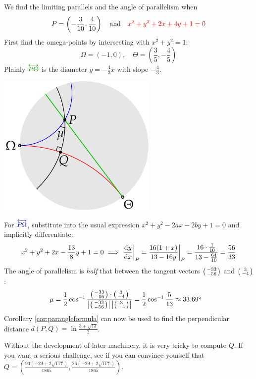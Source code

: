 \begin{examples}{}{}
\begin{enumerate}
\begin{minipage}[t]{0.68\linewidth}\vspace{0pt}
  \item We find the limiting parallels and the angle of parallelism when
	\[P=\left(-\frac 3{10},\frac 4{10}\right)\quad\text{and}\quad \textcolor{red}{x^2+y^2+2x+4y+1=0}\]
	First find the omega-points by intersecting with $x^2+y^2=1$:
	\[\Omega=(-1,0),\quad \Theta=\left(\frac 35,-\frac 45\right)\]
	Plainly $\textcolor{Green}{\overleftrightarrow{P\Theta}}$ is the diameter $y=-\frac 43x$ with slope $-\frac 43$.
\end{minipage}\begin{minipage}[t]{0.32\linewidth}\vspace{0pt}
	\flushright\includegraphics{basic-parallels3}
\end{minipage}\smallbreak
	For $\textcolor{blue}{\overleftrightarrow{P\Omega}}$, substitute into the usual expression $x^2+y^2-2ax-2by+1=0$ and implicitly differentiate:
	\[x^2+y^2+2x-\frac{13}8y+1=0\implies \diffat[y]{x}{P}=\frac{16(1+x)}{13-16y}\bigg|_P=\frac{16\cdot\frac 7{10}}{13-\frac{64}{10}}=\frac{56}{33}\]
	The angle of parallelism is \emph{half} that between the tangent vectors $\stwovec{-33}{-56}$ and $\stwovec 3{-4}$:
\begin{align*}
\mu&=\frac 12\cos^{-1}\frac{\stwovec{-33}{-56}\cdot\stwovec{3}{-4}}{\nm{\stwovec{-33}{-56}}\nm{\stwovec{3}{-4}}}
=\frac 12\cos^{-1}\frac 5{13}\approx \ang{33.69}
\end{align*}
Corollary \ref{cor:parangleformula} can now be used to find the perpendicular distance $d(P,Q)=\ln\frac{3+\sqrt{13}}2$.\par
Without the development of later machinery, it is very tricky to compute $Q$. If you want a serious challenge, see if you can convince yourself that $Q=\left(\frac{93(-29+2\sqrt{117})}{1865},\frac{26(-29+2\sqrt{117})}{1865}\right)$.
\end{enumerate}
\end{examples}

